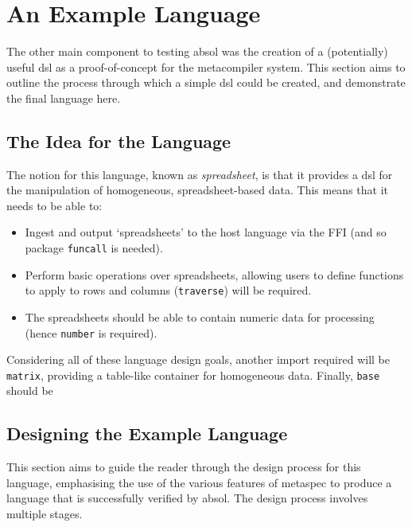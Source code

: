 \section{An Example Language} %
\label{sec:an_example_language}
The other main component to testing \gls{absol} was the creation of a (potentially) useful \gls{dsl} as a proof-of-concept for the metacompiler system. 
This section aims to outline the process through which a simple \gls{dsl} could be created, and demonstrate the final language here. 

\subsection{The Idea for the Language} %
\label{sub:the_idea_for_the_language}
The notion for this language, known as \textit{spreadsheet}, is that it provides a \gls{dsl} for the manipulation of homogeneous, spreadsheet-based data. 
This means that it needs to be able to:
\begin{itemize}
    \item Ingest and output `spreadsheets' to the host language via the FFI (and so package \texttt{funcall} is needed).
    \item Perform basic operations over spreadsheets, allowing users to define functions to apply to rows and columns (\texttt{traverse}) will be required. 
    \item The spreadsheets should be able to contain numeric data for processing (hence \texttt{number} is required). 
\end{itemize}

Considering all of these language design goals, another import required will be \texttt{matrix}, providing a table-like container for homogeneous data. 
Finally, \texttt{base} should be 


\subsection{Designing the Example Language} %
\label{sub:designing_the_example_language}
This section aims to guide the reader through the design process for this language, emphasising the use of the various features of \gls{metaspec} to produce a language that is successfully verified by \gls{absol}. 
The design process involves multiple stages. 

